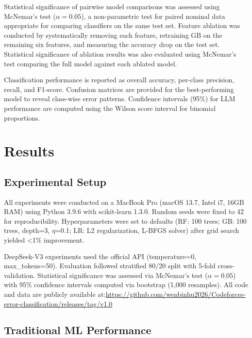 \documentclass[10pt,letterpaper]{article}
\begin{document}
Statistical significance of pairwise model comparisons was assessed using
McNemar's test \cite{mcnemar1947note} ($\alpha = 0.05$), a non-parametric test for paired nominal
data appropriate for comparing classifiers on the same test set.
Feature ablation was conducted by systematically removing each feature,
retraining GB on the remaining six features, and measuring the accuracy
drop on the test set. Statistical significance of ablation results was also
evaluated using McNemar's test comparing the full model against each ablated
model.

Classification performance is reported as overall accuracy, per-class
precision, recall, and F1-score. Confusion matrices are provided for the
best-performing model to reveal class-wise error patterns. Confidence
intervals (95\%) for LLM performance are computed using the Wilson score
interval for binomial proportions.

\section{Results}

\subsection{Experimental Setup}

All experiments were conducted on a MacBook Pro (macOS 13.7, Intel i7, 16GB RAM) using Python 3.9.6 with scikit-learn 1.3.0. Random seeds were fixed to 42 for reproducibility. Hyperparameters were set to defaults (RF: 100 trees; GB: 100 trees, depth=3, $\eta$=0.1; LR: L2 regularization, L-BFGS solver) after grid search yielded <1\% improvement.

DeepSeek-V3 experiments used the official API (temperature=0, max\_tokens=50). Evaluation followed stratified 80/20 split with 5-fold cross-validation. Statistical significance was assessed via McNemar's test ($\alpha=0.05$) with 95\% confidence intervals computed via bootstrap (1,000 resamples). All code and data are publicly available at:\url{https://github.com/wenbinhu2026/Codeforces-error-classification/releases/tag/v1.0}


\subsection{Traditional ML Performance}
\end{document}
